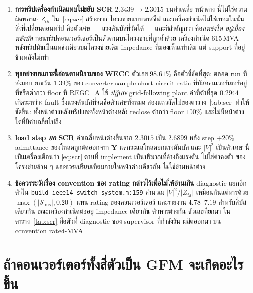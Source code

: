 \documentclass[12pt,a4paper]{article}
\theoremstyle{remark}
\newcommand{\code}[1]{\texttt{\small #1}}
\begin{document}
\begin{enumerate}[leftmargin=1.9em]
\item \textbf{การทริปเครื่องกำเนิดแทบไม่ขยับ SCR} $2.3439 \to 2.3015$ บนค่าเฉลี่ย
      หน้าต่าง นี่ไม่ใช่ความผิดพลาด: $Z_{th}$ ใน~\eqref{eq:scr} สร้างจาก
      โครงข่ายแบบพาสซีฟ และเครื่องกำเนิดไม่ใช่เทอมในนั้น สิ่งที่เปลี่ยนตอนทริป
      คือตัวเศษ --- แรงดันบัสที่วัดได้ --- และที่สำคัญกว่า คือ\emph{แหล่งใด
      อยู่เบื้องหลังบัส} ก่อนทริปคอนเวอร์เตอร์เป็นตัวตามบนโครงข่ายที่ถูกค้ำด้วย
      เครื่องกำเนิด 615\,MVA หลังทริปมันเป็นแหล่งเดียวบนโครงข่ายเดิม
      impedance ที่มองเห็นเท่าเดิม แต่ support ที่อยู่ข้างหลังไม่เท่า
\item \textbf{ทุกอย่างบนเกาะนี้อ่อนตามนิยามของ WECC} ตัวเลข $98.61\%$
      คือตัวที่ชัดที่สุด: ตลอด run ที่ส่งมอบ ยกเว้น $1.39\%$ ของ converter-sample
      short-circuit ratio ที่บัสคอนเวอร์เตอร์อยู่ที่หรือต่ำกว่า floor ที่ REGC\_A
      ใช้ \emph{ปฏิเสธ} grid-following plant ค่าที่ต่ำที่สุด $0.2944$ เกิดระหว่าง
      fault ซึ่งแรงดันบัสที่จมคือตัวเศษทั้งหมด สองแถวถัดไปของตาราง~\ref{tab:scr}
      ทำให้ชัดขึ้น: ทั้งหน้าต่างหลังทริปและทั้งหน้าต่างหลัง reclose ต่ำกว่า floor
      $100\%$ และไม่มีหน้าต่างใดที่มีค่าเฉลี่ยไปถึง
\item \textbf{load step \emph{ยก} SCR} ค่าเฉลี่ยหน้าต่างขึ้นจาก $2.3015$ เป็น
      $2.6899$ หลัง step $+20\%$ admittance ของโหลดถูกตัดออกจาก $\mathbf{Y}$
      แต่กระแสโหลดยกแรงดันบัส และ $|V|^2$ เป็นตัวเศษ นี่เป็นเครื่องเตือนว่า
      \eqref{eq:scr} ตามที่ implement เป็นปริมาณที่อ้างอิงแรงดัน ไม่ใช่ค่าคงตัว
      ของโครงข่ายล้วน ๆ และควรเปรียบเทียบภายในหน้าต่างเดียวกัน ไม่ใช่ข้ามหน้าต่าง
\item \textbf{ข้อควรระวังเรื่อง convention ของ rating กล่าวไว้เพื่อไม่ให้อ่านเกิน}
      diagnostic แยกอีกตัวใน \code{build\_ieee14\_switch\_system.m:159}
      คำนวณ $|V|^2/|Z_{th}|$ เหมือนกันแต่หารด้วย $\max(|S_{\text{bus}}|, 0.20)$
      แทน rating ของคอนเวอร์เตอร์ และรายงาน $4.78$--$7.19$ สำหรับสี่บัสเดียวกัน
      ขณะเครื่องกำเนิดต่ออยู่ impedance เดียวกัน ตัวหารต่างกัน ตัวเลขที่ยกมา
      ในตาราง~\ref{tab:scr} คือตัวที่ diagnostic ของ supervisor ที่กำลังรัน
      ผลิตออกมา บน convention rated-MVA
\end{enumerate}

\section{ถ้าคอนเวอร์เตอร์ทั้งสี่ตัวเป็น GFM จะเกิดอะไรขึ้น}\label{sec:allfour}
\end{document}
